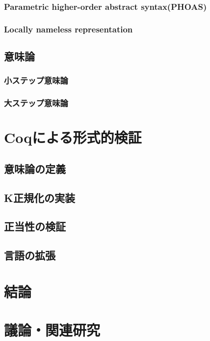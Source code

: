 \documentclass{sumiilab-paper}
\begin{document}
\subsection{Parametric higher-order abstract syntax(PHOAS)}

\subsection{Locally nameless representation}


\section{意味論}\label{chapter:semantics}

\subsection{小ステップ意味論}

\subsection{大ステップ意味論}


\chapter{Coqによる形式的検証}

\section{意味論の定義}
\section{K正規化の実装}
\section{正当性の検証}
\section{言語の拡張}

\chapter{結論}

\chapter{議論・関連研究}
\end{document}

